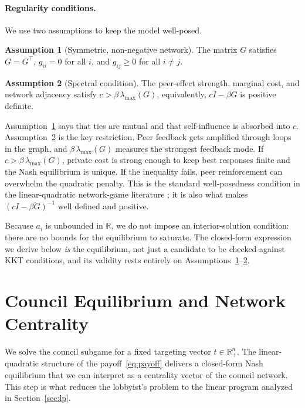 \documentclass[11pt,letterpaper]{article}
\theoremstyle{plain}
\theoremstyle{definition}
\newtheorem{assumption}{Assumption}
\theoremstyle{remark}
\begin{document}
\paragraph{Regularity conditions.} We use two assumptions to keep the model well-posed.

\begin{assumption}[Symmetric, non-negative network]\label{ass:R1}
The matrix $G$ satisfies $G = G^\top$, $g_{ii} = 0$ for all $i$, and $g_{ij} \geq 0$ for all $i \neq j$.
\end{assumption}

\begin{assumption}[Spectral condition]\label{ass:R2}
The peer-effect strength, marginal cost, and network adjacency satisfy $c > \beta\, \lambda_{\max}(G)$, equivalently, $cI - \beta G$ is positive definite.
\end{assumption}

Assumption~\ref{ass:R1} says that ties are mutual and that self-influence is absorbed into $c$. Assumption~\ref{ass:R2} is the key restriction. Peer feedback gets amplified through loops in the graph, and $\beta\,\lambda_{\max}(G)$ measures the strongest feedback mode. If $c > \beta\, \lambda_{\max}(G)$, private cost is strong enough to keep best responses finite and the Nash equilibrium is unique. If the inequality fails, peer reinforcement can overwhelm the quadratic penalty. This is the standard well-posedness condition in the linear-quadratic network-game literature \citep{bcz2006, ggg2020}; it is also what makes $(cI - \beta G)^{-1}$ well defined and positive.

Because $a_i$ is unbounded in $\mathbb{R}$, we do not impose an interior-solution condition: there are no bounds for the equilibrium to saturate. The closed-form expression we derive below \emph{is} the equilibrium, not just a candidate to be checked against KKT conditions, and its validity rests entirely on Assumptions~\ref{ass:R1}--\ref{ass:R2}.


\section{Council Equilibrium and Network Centrality}
\label{sec:eq}

We solve the council subgame for a fixed targeting vector $t \in \mathbb{R}^n_+$. The linear-quadratic structure of the payoff~\eqref{eq:payoff} delivers a closed-form Nash equilibrium that we can interpret as a centrality vector of the council network. This step is what reduces the lobbyist's problem to the linear program analyzed in Section~\ref{sec:lp}.
\end{document}
